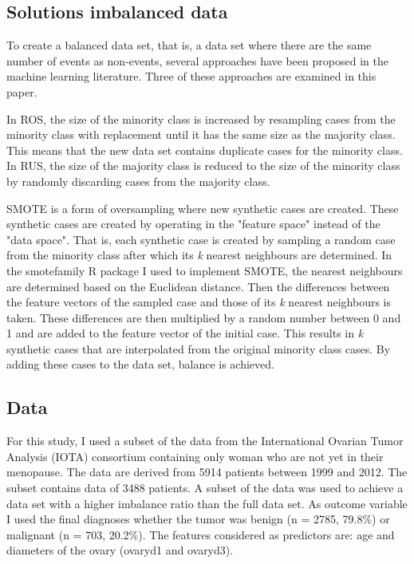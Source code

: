 \documentclass[AMA,STIX1COL, table]{WileyNJD-v2}
\begin{document}
\subsection{Solutions imbalanced data}
To create a balanced data set, that is, a data set where there are the same number of events as non-events, several approaches have been proposed in the machine learning literature. Three of these approaches are examined in this paper.

In ROS, the size of the minority class is increased by resampling cases from the minority class with replacement until it has the same size as the majority class. This means that the new data set contains duplicate cases for the minority class. In RUS, the size of the majority class is reduced to the size of the minority class by randomly discarding cases from the majority class. 

SMOTE is a form of oversampling where new synthetic cases are created. These synthetic cases are created by operating in the "feature space" instead of the "data space".\cite{Chawla2002} \cite{Smote2018} That is, each synthetic case is created by sampling a random case from the minority class after which its \emph{k} nearest neighbours are determined. In the {\selectfont smotefamily} R package I used to implement SMOTE, the nearest neighbours are determined based on the Euclidean distance.\cite{smotefamily}\cite{FNN} Then the differences between the feature vectors of the sampled case and those of its \emph{k} nearest neighbours is taken. These differences are then multiplied by a random number between 0 and 1 and are added to the feature vector of the initial case. This results in \emph{k} synthetic cases that are interpolated from the original minority class cases. By adding these cases to the data set, balance is achieved.
    


\subsection{Data} \label{sec3}
For this study, I used a subset of the data from the International Ovarian Tumor Analysis (IOTA) consortium containing only woman who are not yet in their menopause. \cite{VanCalster2014} The data are derived from 5914 patients between 1999 and 2012. The subset contains data of 3488 patients. A subset of the data was used to achieve a data set with a higher imbalance ratio than the full data set. As outcome variable I used the final diagnoses whether the tumor was benign (n = 2785, 79.8\%) or malignant (n = 703, 20.2\%). The features considered as predictors are: age and diameters of the ovary (ovaryd1 and ovaryd3).
\end{document}
